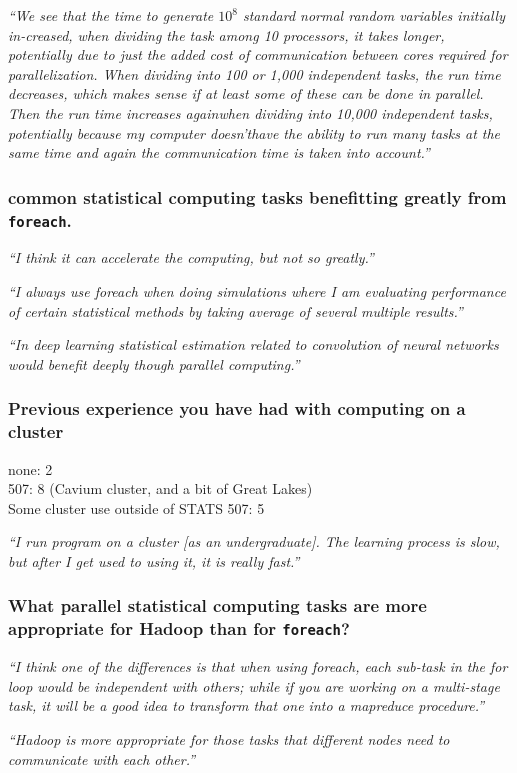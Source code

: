 \documentclass[12pt]{beamer}
\newcommand\ans[1]{{\it ``#1''}}
\newcommand\gap{\vspace{5mm}}
\begin{document}
\begin{frame}

  \ans{We see that the time to generate $10^8$ standard normal random variables initially in-creased, when dividing the task among 10 processors, it takes longer, potentially due to just the added cost of communication between cores required for parallelization.  When dividing into 100 or 1,000 independent tasks, the run time decreases, which makes sense if at least some of these can be done in parallel.  Then the run time increases againwhen dividing into 10,000 independent tasks, potentially because my computer doesn’thave the ability to run many tasks at the same time and again the communication time is taken into account.}
  
\end{frame}

\begin{frame} %
  
  \frametitle{common statistical computing tasks benefitting greatly from \texttt{foreach}.}


  \ans{I think it can accelerate the computing, but not so greatly.}

  \gap
  
  \ans{I  always  use  foreach  when  doing  simulations  where  I  am  evaluating  performance  of certain statistical methods by taking average of several multiple results.}

  \gap
  
  \ans{In deep learning statistical estimation related to convolution of neural networks would benefit deeply though parallel computing.}
  
\end{frame}

\begin{frame}
\frametitle{Previous experience you have had with computing on a cluster}

none: 2 \\
507: 8 (Cavium cluster, and a bit of Great Lakes)\\
Some cluster use outside of STATS 507: 5

\gap

\ans{I run program on a cluster [as an undergraduate].  The learning process is slow, but after I get used to using it, it is really fast.}

\end{frame}


\begin{frame} 

  \frametitle{What parallel statistical computing tasks are more appropriate for Hadoop than for \texttt{foreach}?}


  \ans{I think one of the differences is that when using foreach, each sub-task in the for loop would be independent with others; while if you are working on a multi-stage task, it will be a good idea to transform that one into a mapreduce procedure.}

  \gap
  
  \ans{Hadoop is more appropriate for those tasks that different nodes need to communicate with each other.}
  
\end{frame}
\end{document}
